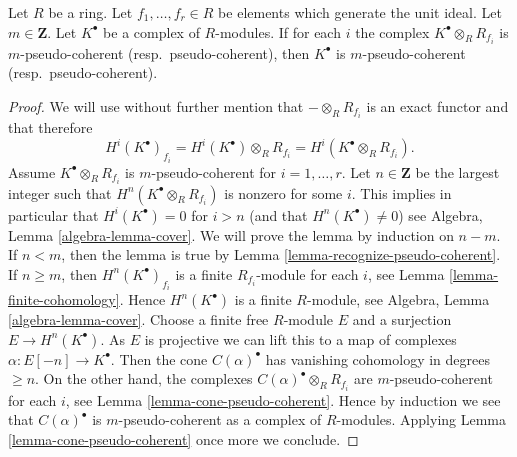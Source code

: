 \begin{lemma}
\label{lemma-glue-pseudo-coherent}
Let $R$ be a ring. Let $f_1, \ldots, f_r \in R$ be elements which
generate the unit ideal. Let $m \in \mathbf{Z}$. Let $K^\bullet$
be a complex of $R$-modules. If for each $i$ the complex
$K^\bullet \otimes_R R_{f_i}$ is $m$-pseudo-coherent
(resp.\ pseudo-coherent), then $K^\bullet$ is $m$-pseudo-coherent
(resp.\ pseudo-coherent).
\end{lemma}

\begin{proof}
We will use without further mention that $- \otimes_R R_{f_i}$ is
an exact functor and that therefore
$$
H^i(K^\bullet)_{f_i} =
H^i(K^\bullet) \otimes_R R_{f_i} = H^i(K^\bullet \otimes_R R_{f_i}).
$$
Assume $K^\bullet \otimes_R R_{f_i}$ is $m$-pseudo-coherent
for $i = 1, \ldots, r$. Let $n \in \mathbf{Z}$ be the largest
integer such that $H^n(K^\bullet \otimes_R R_{f_i})$ is nonzero
for some $i$. This implies in particular that $H^i(K^\bullet) = 0$
for $i > n$ (and that $H^n(K^\bullet) \not = 0$) see
Algebra, Lemma \ref{algebra-lemma-cover}.
We will prove the lemma by induction on $n - m$.
If $n < m$, then the lemma is true by
Lemma \ref{lemma-recognize-pseudo-coherent}.
If $n \geq m$, then $H^n(K^\bullet)_{f_i}$ is a finite $R_{f_i}$-module
for each $i$, see
Lemma \ref{lemma-finite-cohomology}.
Hence $H^n(K^\bullet)$ is a finite $R$-module, see
Algebra, Lemma \ref{algebra-lemma-cover}.
Choose a finite free $R$-module $E$ and a surjection $E \to H^n(K^\bullet)$.
As $E$ is projective we can lift this to a map of complexes
$\alpha : E[-n] \to K^\bullet$. Then the cone $C(\alpha)^\bullet$ has
vanishing cohomology in degrees $\geq n$. On the other hand, the
complexes $C(\alpha)^\bullet \otimes_R R_{f_i}$ are $m$-pseudo-coherent
for each $i$, see
Lemma \ref{lemma-cone-pseudo-coherent}.
Hence by induction we see that $C(\alpha)^\bullet$ is $m$-pseudo-coherent
as a complex of $R$-modules. Applying
Lemma \ref{lemma-cone-pseudo-coherent}
once more we conclude.
\end{proof}
